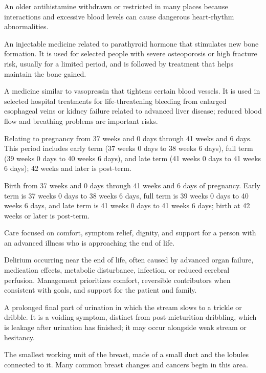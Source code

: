  An older antihistamine withdrawn or restricted in many places because interactions and excessive blood levels can cause dangerous heart-rhythm abnormalities.

 An injectable medicine related to parathyroid hormone that stimulates new bone formation. It is used for selected people with severe osteoporosis or high fracture risk, usually for a limited period, and is followed by treatment that helps maintain the bone gained.

 A medicine similar to vasopressin that tightens certain blood vessels. It is used in selected hospital treatments for life-threatening bleeding from enlarged esophageal veins or kidney failure related to advanced liver disease; reduced blood flow and breathing problems are important risks.

 Relating to pregnancy from 37 weeks and 0 days through 41 weeks and 6 days. This period includes early term (37 weeks 0 days to 38 weeks 6 days), full term (39 weeks 0 days to 40 weeks 6 days), and late term (41 weeks 0 days to 41 weeks 6 days); 42 weeks and later is post-term.

 Birth from 37 weeks and 0 days through 41 weeks and 6 days of pregnancy. Early term is 37 weeks 0 days to 38 weeks 6 days, full term is 39 weeks 0 days to 40 weeks 6 days, and late term is 41 weeks 0 days to 41 weeks 6 days; birth at 42 weeks or later is post-term.

 Care focused on comfort, symptom relief, dignity, and support for a person with an advanced illness who is approaching the end of life.

 Delirium occurring near the end of life, often caused by advanced organ failure,
medication effects, metabolic disturbance, infection, or reduced cerebral perfusion.
Management prioritizes comfort, reversible contributors when consistent with goals, and
support for the patient and family.

 A prolonged final part of urination in which the stream
slows to a trickle or dribble. It is a voiding symptom, distinct from post-micturition
dribbling, which is leakage after urination has finished; it may occur alongside weak
stream or hesitancy.

 The smallest working unit of the breast, made of a small duct and the lobules connected to it. Many common breast changes and cancers begin in this area.

